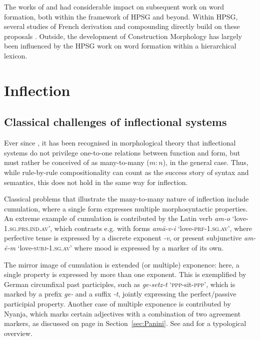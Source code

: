 \documentclass[output=paper
	        ,collection
	        ,collectionchapter
 	        ,biblatex
                ,babelshorthands
                ,newtxmath
                ,draftmode
                ,colorlinks, citecolor=brown
]{langscibook}
\begin{document}
The works of \citet{Riehemann98} and \cite{Koenig99} had considerable
impact on subsequent work on word formation, both within the framework 
of HPSG and beyond. Within HPSG, several studies of French derivation
and compounding directly build on these proposals \citep[e.g.][]{Tribout10,Desmets09}. 
Outside, the development of Construction Morphology
\citep{Booij10} has largely been influenced by the HPSG work on word
formation within a hierarchical lexicon. 

\section{Inflection}
\label{sec:Infl}\label{sec:inflection}

\subsection{Classical challenges of inflectional systems}
\label{sec:InflChallenges}

Ever since \citet{Matthews72}, it has been recognised in morphological
theory that inflectional systems do not privilege one-to-one relations
between function and form, but must rather be conceived of as
many-to-many ($m:n$), in the general case. Thus, while
rule-by-rule compositionality can count as the success story
of syntax and semantics, this does not hold in the same way for inflection. 

Classical problems that illustrate the many-to-many nature of
inflection include cumulation, where a single form expresses multiple
morphosyntactic properties. An extreme example of cumulation is
contributed by the Latin verb \textit{am-o}
`love-1.\textsc{sg}.\textsc{prs}.\textsc{ind}.\textsc{av}', which
contrasts e.g. with forms \textit{amā-v-i}
`love-\textsc{prf}-\textsc{1.sg.av}', where perfective tense is
expressed by a discrete exponent \textit{-v}, or present subjunctive
\textit{am-ē-m} `love-\textsc{subj}-\textsc{1.sg.av}' where mood is
expressed by a marker of its own.

The mirror image of cumulation is extended (or multiple) exponence:
here, a single property is expressed by more than one exponent. This
is exemplified by German circumfixal past participles, such as
\textit{ge-setz-t} `\textsc{ppp}-sit-\textsc{ppp}', which is
 marked by a prefix \textit{ge-} and a suffix \textit{-t},
jointly expressing the perfect/passive participial property. Another
case of multiple exponence is contributed by Nyanja, which marks
certain adjectives with a combination of two agreement markers, as
discussed on page \pageref{Nyanja} in
Section~\ref{sec:Panini}.  See
\citet{caballero_g-harris_a12} and \citet{Harris17} for a typological overview. 
\end{document}
